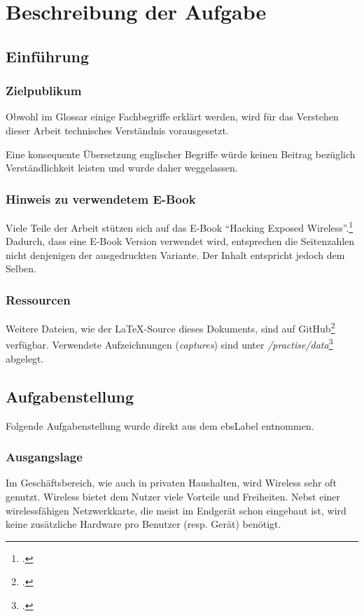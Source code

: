 \chapter{Beschreibung der Aufgabe}

\section{Einführung}
\subsection{Zielpublikum}
Obwohl im Glossar einige Fachbegriffe erklärt werden, wird für das Verstehen dieser Arbeit technisches Verständnis vorausgesetzt.

Eine konsequente Übersetzung englischer Begriffe würde keinen Beitrag bezüglich Verständlichkeit leisten und wurde daher weggelassen.

\subsection{Hinweis zu verwendetem E-Book}
Viele Teile der Arbeit stützen sich auf das E-Book "`Hacking Exposed Wireless"'.\footcite{WrightCache201503}
Dadurch, dass eine E-Book Version verwendet wird, entsprechen die Seitenzahlen nicht denjenigen der ausgedruckten Variante.
Der Inhalt entspricht jedoch dem Selben.

\subsection{Ressourcen}
Weitere Dateien, wie der \LaTeX-Source dieses Dokuments, sind auf GitHub\footcite{GitHub_wlan_seminar_2015-04-16} verfügbar.
Verwendete Aufzeichnungen (\textit{captures}) sind unter \textit{/practise/data}\footcite{GitHub_wlan_seminar_practise_data_2015-04-16} abgelegt.

\section{Aufgabenstellung}
Folgende Aufgabenstellung wurde direkt aus dem \gls{ebsLabel} entnommen.

\subsection{Ausgangslage}
Im Geschäftsbereich, wie auch in privaten Haushalten, wird Wireless sehr oft genutzt.
Wireless bietet dem Nutzer viele Vorteile und Freiheiten. Nebst einer wirelessfähigen Netzwerkkarte, die meist im Endgerät schon eingebaut ist, wird keine zusätzliche Hardware pro Benutzer (resp. Gerät) benötigt.

